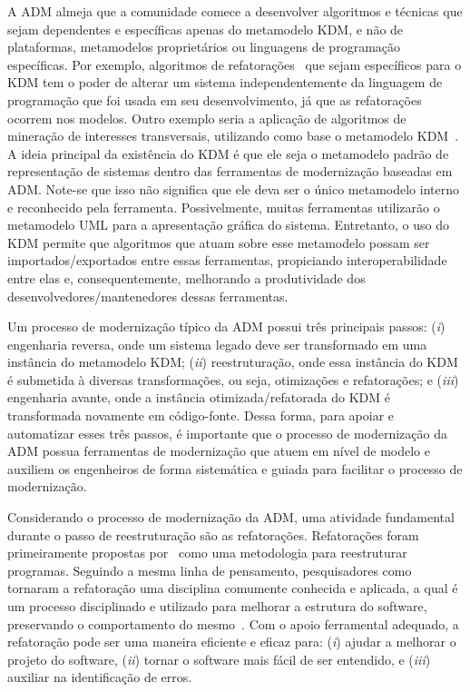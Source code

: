 A ADM almeja que a comunidade comece a desenvolver algoritmos e técnicas que sejam dependentes e específicas apenas do metamodelo KDM, e não de plataformas, metamodelos proprietários ou linguagens de programação específicas. Por exemplo, algoritmos de refatorações~\cite{durelli_catalogo} que sejam específicos para o KDM tem o poder de alterar um sistema independentemente da linguagem de programação que foi usada em seu desenvolvimento, já que as refatorações ocorrem nos modelos. Outro exemplo seria a aplicação de algoritmos de mineração de interesses transversais, utilizando como base o metamodelo KDM~\cite{Durelli:2013_ACM, dani_san, daniel_san_journal}. 
%
A ideia principal da existência do  KDM  é que ele seja o metamodelo padrão de representação de sistemas  dentro das ferramentas de modernização baseadas em ADM. Note-se que isso não significa que ele deva ser o único metamodelo interno e reconhecido pela ferramenta. Possivelmente, muitas ferramentas utilizarão o metamodelo UML para a apresentação gráfica do sistema. Entretanto, o  uso do KDM permite que algoritmos que atuam sobre esse metamodelo  possam ser importados/exportados entre essas ferramentas, propiciando interoperabilidade entre elas e, consequentemente, melhorando a produtividade dos desenvolvedores/mantenedores dessas ferramentas.

Um processo de modernização típico da ADM possui três principais passos: (\textit{i}) engenharia reversa, onde um sistema legado deve ser transformado em uma instância do metamodelo KDM; (\textit{ii}) reestruturação, onde essa instância do KDM é submetida à diversas transformações, ou seja, otimizações e refatorações; e (\textit{iii}) engenharia avante, onde a instância otimizada/refatorada do KDM é transformada novamente em código-fonte. Dessa forma, para apoiar e automatizar esses três passos, é importante que o processo de modernização da ADM possua ferramentas de modernização que atuem em nível de modelo e auxiliem os engenheiros de forma sistemática e guiada para facilitar o processo de modernização.

Considerando o processo de modernização da ADM, uma atividade fundamental durante o passo de reestruturação são as refatorações. Refatorações foram primeiramente propostas por~ como uma metodologia para reestruturar programas. Seguindo a mesma linha de pensamento, pesquisadores como  tornaram a refatoração uma disciplina comumente conhecida e aplicada, a qual é um processo disciplinado e utilizado para melhorar a estrutura do software, preservando o comportamento do mesmo~\cite{Fowler1999}. Com o apoio ferramental adequado, a refatoração pode ser uma maneira eficiente e eficaz para: (\textit{i}) ajudar a melhorar o projeto do software, (\textit{ii}) tornar o software mais fácil de ser entendido, e (\textit{iii}) auxiliar na identificação de erros. %

